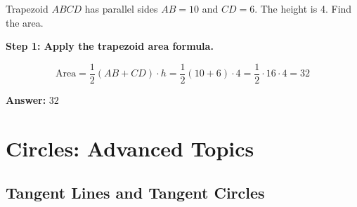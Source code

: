 ﻿\documentclass[12pt]{extarticle}
\begin{document}
Trapezoid $ABCD$ has parallel sides $AB = 10$ and $CD = 6$. The height is 4. Find the area.

\begin{solutionbox}
\textbf{Step 1: Apply the trapezoid area formula.}

\[\text{Area} = \frac{1}{2}(AB + CD) \cdot h = \frac{1}{2}(10 + 6) \cdot 4 = \frac{1}{2} \cdot 16 \cdot 4 = 32\]

\textbf{Answer:} $\boxed{32}$
\end{solutionbox}

\section{Circles: Advanced Topics}

\subsection{Tangent Lines and Tangent Circles}
\end{document}
